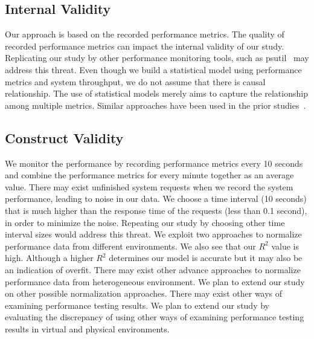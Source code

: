 \subsection{Internal Validity}
Our approach is based on the recorded performance metrics. The quality of recorded performance metrics can impact the internal validity of our study. Replicating our study by other performance monitoring tools, such as psutil~\cite{psutil} may address this threat. Even though we build a statistical model using performance metrics and system throughput, we do not assume that there is causal relationship. The use of statistical models merely aims to capture the relationship among multiple metrics. Similar approaches have been used in the prior studies~\cite{Cohen:2005:CIC:1095810.1095821, Shang:2015:ADP:2668930.2688052, xiong2013vperfguard}. 



\subsection{Construct Validity}
We monitor the performance by recording performance metrics every 10 seconds and combine the performance metrics for every minute together as an average value. There may exist unfinished system requests when we record the system performance, leading to noise in our data. We choose a time interval (10 seconds) that is much higher than the response time of the requests (less than 0.1 second), in order to minimize the noise. Repeating our study by choosing other time interval sizes would address this threat. We exploit two approaches to normalize performance data from different environments. We also see that our {$R^2$} value is high. Although a higher {$R^2$} determines our model is accurate but it may also be an indication of overfit. There may exist other advance approaches to normalize performance data from heterogeneous environment. We plan to extend our study on other possible normalization approaches. There may exist other ways of examining performance testing results. We plan to extend our study by evaluating the discrepancy of using other ways of examining performance testing results in virtual and physical environments.



